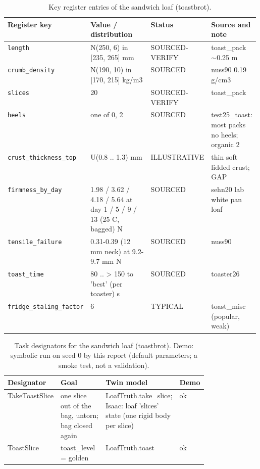 \documentclass[10.5pt,a4paper]{article}
\begin{document}
\begin{table}[htbp]\centering\scriptsize\caption{Key register entries of the sandwich loaf (toastbrot).}
\begin{tabularx}{\linewidth}{@{}p{0.19\linewidth}p{0.27\linewidth}p{0.12\linewidth}X@{}}\toprule Register key & Value / distribution & Status & Source and note \\\midrule
\texttt{length} & N(250, 6) in [235, 265] mm & SOURCED-VERIFY & toast\_pack $\sim$0.25 m \\
\texttt{crumb\_\allowbreak{}density} & N(190, 10) in [170, 215] kg/m3 & SOURCED & nuss90 0.19 g/cm3 \\
\texttt{slices} & 20 & SOURCED-VERIFY & toast\_pack \\
\texttt{heels} & one of 0, 2 & SOURCED & test25\_toast: most packs no heels; organic 2 \\
\texttt{crust\_\allowbreak{}thickness\_\allowbreak{}top} & U(0.8 .. 1.3) mm & ILLUSTRATIVE & thin soft lidded crust; GAP \\
\texttt{firmness\_\allowbreak{}by\_\allowbreak{}day} & 1.98 / 3.62 / 4.18 / 5.64 at day 1 / 5 / 9 / 13 (25 C, bagged) N & SOURCED & sehn20 lab white pan loaf \\
\texttt{tensile\_\allowbreak{}failure} & 0.31-0.39 (12 mm neck) at 9.2-9.7 mm N & SOURCED & nuss90 \\
\texttt{toast\_\allowbreak{}time} & 80 .. > 150 to 'best' (per toaster) s & SOURCED & toaster26 \\
\texttt{fridge\_\allowbreak{}staling\_\allowbreak{}factor} & 6 & TYPICAL & toast\_misc (popular, weak) \\\bottomrule\end{tabularx}\end{table}
\begin{table}[htbp]\centering\scriptsize\caption{Task designators for the sandwich loaf (toastbrot). Demo: symbolic run on seed 0 by this report (default parameters; a smoke test, not a validation).}
\begin{tabularx}{\linewidth}{@{}p{0.16\linewidth}Xp{0.3\linewidth}l@{}}\toprule Designator & Goal & Twin model & Demo \\\midrule
TakeToastSlice & one slice out of the bag, untorn; bag closed again & LoafTruth.take\_slice; Isaac: loaf 'slices' state (one rigid body per slice) & ok \\
ToastSlice & toast\_level = golden & LoafTruth.toast & ok \\\bottomrule\end{tabularx}\end{table}
\end{document}
